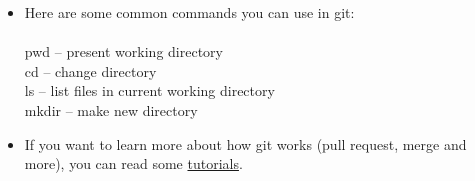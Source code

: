 \documentclass[10pt]{article} %
\begin{document}
\begin{itemize}
        \item Here are some common commands you can use in git:
        \\
        \\
        pwd -- present working directory\\
        cd -- change directory\\
        ls -- list files in current working directory\\
        mkdir -- make new directory\\

        \item If you want to learn more about how git works (pull request, merge and more), you can read some \href{https://www.atlassian.com/git}{tutorials}.

      \end{itemize}
\end{document}
